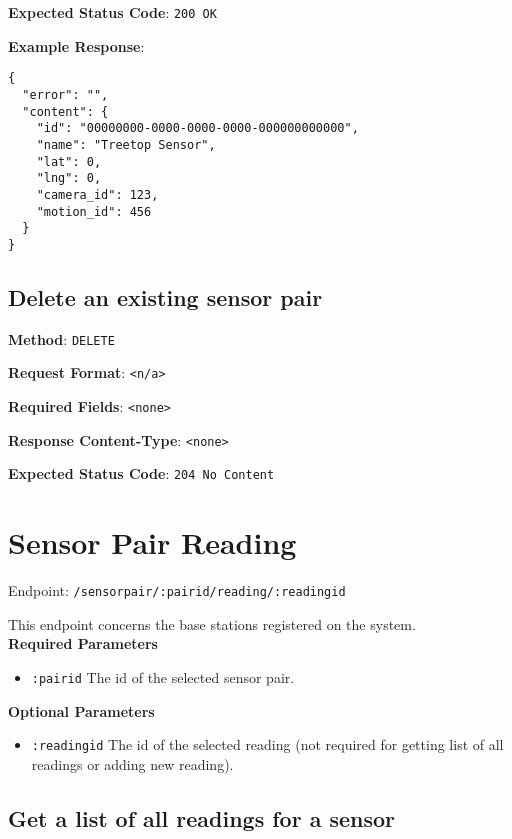 \noindent
\textbf{Expected Status Code}: \texttt{200 OK}

\noindent
\textbf{Example Response}:
\begin{verbatim}
{ 
  "error": "",
  "content": {
    "id": "00000000-0000-0000-0000-000000000000",
    "name": "Treetop Sensor",
    "lat": 0,
    "lng": 0,
    "camera_id": 123,
    "motion_id": 456
  }
}
\end{verbatim}


\subsection{Delete an existing sensor pair}

\noindent
\textbf{Method}: \texttt{DELETE}

\noindent
\textbf{Request Format}: \texttt{<n/a>}

\noindent
\textbf{Required Fields}: \texttt{<none>}

\noindent
\textbf{Response Content-Type}: \texttt{<none>}

\noindent
\textbf{Expected Status Code}: \texttt{204 No Content}



\section{Sensor Pair Reading}

Endpoint: \texttt{/sensorpair/:pairid/reading/:readingid}

\noindent
This endpoint concerns the base stations registered on the system.\\

\noindent
\textbf{Required Parameters}
\begin{itemize}
   \item \texttt{:pairid} \textemdash The id of the selected sensor pair.
\end{itemize}

\noindent
\textbf{Optional Parameters}
\begin{itemize}
   \item \texttt{:readingid} \textemdash The id of the selected reading (not
   required for getting list of all readings or adding new reading).
\end{itemize}


\subsection{Get a list of all readings for a sensor}

